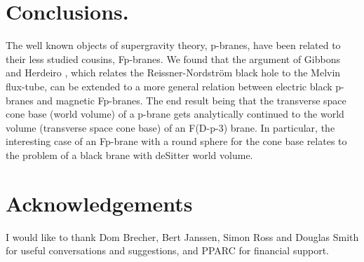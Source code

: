 \documentclass[a4paper,11pt]{article}
\begin{document}
\setcounter{equation}{0}
\section{Conclusions.}

The well known objects of supergravity theory, p-branes, have been related
to their less studied cousins, Fp-branes. We found that
the argument of Gibbons and Herdeiro \cite{gibbons01},
which relates the Reissner-Nordstr\"{o}m black hole to the Melvin
flux-tube, can be extended to a more general relation between 
electric black p-branes
and magnetic Fp-branes. The end result being 
that the transverse space cone base (world volume) 
of a p-brane gets analytically continued to the world volume 
(transverse space cone base) of an F(D-p-3) brane.
In particular, the interesting case of an Fp-brane with
a round sphere for the cone base relates to the problem
of a black brane with deSitter world volume.



\section{Acknowledgements}
I would like to thank Dom Brecher, Bert Janssen,
Simon Ross and Douglas Smith for useful conversations
and suggestions, 
and PPARC for financial support.
\end{document}

